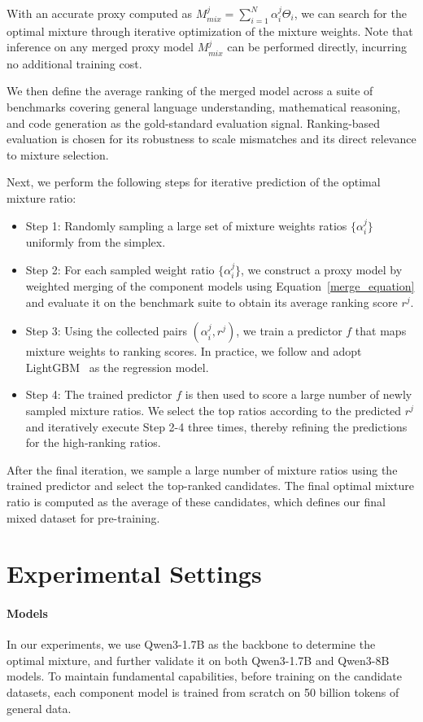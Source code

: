 \documentclass{article}
\theoremstyle{plain}
\theoremstyle{definition}
\theoremstyle{remark}
\begin{document}
With an accurate proxy computed as $M_{mix}^j=\sum_{i=1}^N \alpha_i^j \Theta_i$, we can search for the optimal mixture through iterative optimization of the mixture weights. Note that inference on any merged proxy model $M_{mix}^j$ can be performed directly, incurring no additional training cost.

We then define the average ranking of the merged model across a suite of benchmarks covering general language understanding, mathematical reasoning, and code generation as the gold-standard evaluation signal. Ranking-based evaluation is chosen for its robustness to scale mismatches and its direct relevance to mixture selection.

Next, we perform the following steps for iterative prediction of the optimal mixture ratio:
\begin{itemize}
    \item Step 1: Randomly sampling a large set of mixture weights ratios $\{\alpha_i^j\}$ uniformly from the simplex.
    \item Step 2: For each sampled weight ratio $\{\alpha_i^j\}$, we construct a proxy model by weighted merging of the component models using Equation~\ref{merge_equation} and evaluate it on the benchmark suite to obtain its average ranking score $r^j$.
    \item Step 3: Using the collected pairs $(\alpha_i^j, r^j)$, we train a predictor $f$ that maps mixture weights to ranking scores. In practice, we follow \citet{liu2024regmix} and adopt LightGBM~\citep{lightgbm} as the regression model.
    \item Step 4: The trained predictor $f$ is then used to score a large number of newly sampled mixture ratios. We select the top ratios according to the predicted $r^j$ and iteratively execute Step 2-4 three times, thereby refining the predictions for the high‑ranking ratios.
\end{itemize}

After the final iteration, we sample a large number of mixture ratios using the trained predictor and select the top-ranked candidates. The final optimal mixture ratio is computed as the average of these candidates, which defines our final mixed dataset for pre-training.

\section{Experimental Settings}


\paragraph{Models}
In our experiments, we use Qwen3-1.7B \cite{yang2025qwen3} as the backbone to determine the optimal mixture, and further validate it on both Qwen3-1.7B and Qwen3-8B models. To maintain fundamental capabilities, before training on the candidate datasets, each component model is trained from scratch on 50 billion tokens of general data.
\end{document}
